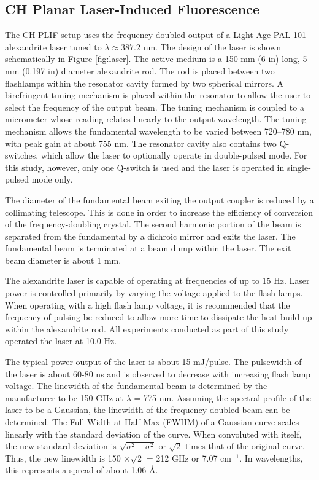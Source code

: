\subsection{CH Planar Laser-Induced Fluorescence}
\label{subsec:experimental-ch-planar-laser-induced-fluorescence}



The CH PLIF setup uses the frequency-doubled output of a Light Age PAL 101 alexandrite laser tuned to \(\lambda \approx 387.2\) nm.
The design of the laser is shown schematically in Figure \ref{fig:laser}.
The active medium is a 150 mm (6 in) long, 5 mm (0.197 in) diameter alexandrite rod.
The rod is placed between two flashlamps within the resonator cavity formed by two spherical mirrors.
A birefringent tuning mechanism is placed within the resonator to allow the user to select the frequency of the output beam.
The tuning mechanism is coupled to a micrometer whose reading relates linearly to the output wavelength.
The tuning mechanism allows the fundamental wavelength to be varied between 720--780 nm, with peak gain at about 755 nm.
The resonator cavity also contains two Q-switches, which allow the laser to optionally operate in double-pulsed mode.
For this study, however, only one Q-switch is used and the laser is operated in single-pulsed mode only.

The diameter of the fundamental beam exiting the output coupler is reduced by a collimating telescope.
This is done in order to increase the efficiency of conversion of the frequency-doubling crystal.
The second harmonic portion of the beam is separated from the fundamental by a dichroic mirror and exits the laser.
The fundamental beam is terminated at a beam dump within the laser.
The exit beam diameter is about 1 mm.

The alexandrite laser is capable of operating at frequencies of up to 15 Hz.
Laser power is controlled primarily by varying the voltage applied to the flash lamps.
When operating with a high flash lamp voltage, it is recommended that the frequency of pulsing be reduced to allow more time to dissipate the heat build up within the alexandrite rod.
All experiments conducted as part of this study operated the laser at 10.0 Hz.

The typical power output of the laser is about 15 mJ/pulse.
The pulsewidth of the laser is about 60-80 ns and is observed to decrease with increasing flash lamp voltage.
The linewidth of the fundamental beam is determined by the manufacturer to be 150 GHz at \(\lambda\) = 775 nm.
Assuming the spectral profile of the laser to be a Gaussian, the linewidth of the frequency-doubled beam can be determined.
The Full Width at Half Max (FWHM) of a Gaussian curve scales linearly with the standard deviation of the curve.
When convoluted with itself, the new standard deviation is \(\sqrt{\sigma^2 + \sigma^2}\) or \(\sqrt{2}\) times that of the original curve.
Thus, the new linewidth is 150 \(\times\sqrt{2}\) = 212 GHz or 7.07 cm\(^{-1}\).
In wavelengths, this represents a spread of about 1.06 \AA.

